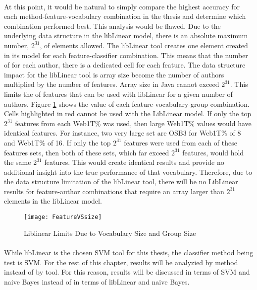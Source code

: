 	\paragraph*{} At this point, it would be natural to simply compare the highest accuracy for each method-feature-vocabulary combination in the thesis and determine which combination performed best.  This analysis would be flawed.  Due to the underlying data structure in the libLinear model, there is an absolute maximum number, $2^{31}$, of elements allowed.  The libLinear tool creates one element created in its model for each feature-classifier combination.  This means that the number of for each author, there is a dedicated cell for each feature.  The data structure impact for the libLinear tool is array size become the number of authors multiplied by the number of features.  Array size in Java cannot exceed $2^{31}$. This limits the of features that can be used with libLinear for a given number of authors. Figure \ref{fig:FeatureVSsize} shows the value of each feature-vocabulary-group combination.  Cells highlighted in red cannot be used with the LibLinear model.  If only the top $2^{31}$ features from each Web1T\% was used, then large Web1T\% values would have identical features.  For instance, two very large set are OSB3 for Web1T\% of 8 and Web1T\% of 16.  If only the top $2^{31}$ features were used from each of these features sets, then both of these sets, which far exceed $2^{31}$ features, would hold the same $2^{31}$ features.  This would create identical results and provide no additional insight into the true performance of that vocabulary. Therefore, due to the data structure limitation of the libLinear tool, there will be no LibLinear results for feature-author combinations that require an array larger than $2^{31}$ elements in the libLinear model.  
	

\begin{figure}[htbp!]
	\begin{center}
	\centering
	\texttt{[image: FeatureVSsize]}
	\caption{Liblinear Limits Due to Vocabulary Size and Group Size}
	\label{fig:FeatureVSsize}
	\end{center}
\end{figure}


	\paragraph*{}  While libLinear is the chosen SVM tool for this thesis, the classifier method being test is SVM.  For the rest of this chapter, results will be analyzied by method instead of by tool.  For this reason, results will be discussed in terms of SVM and naive Bayes instead of in terms of libLinear and naive Bayes.

